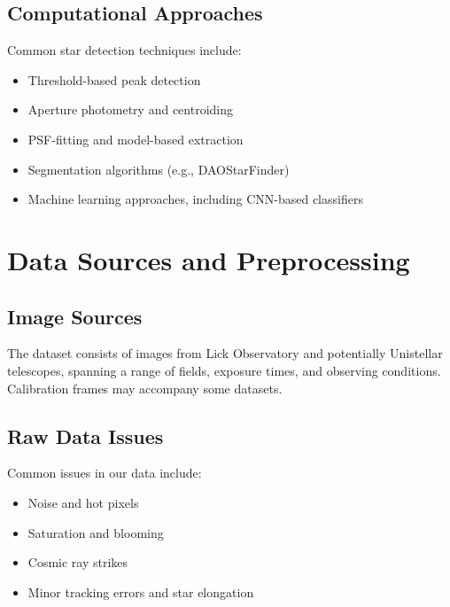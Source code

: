 \documentclass[12pt]{article}
\begin{document}
\subsection{Computational Approaches}
Common star detection techniques include:
\begin{itemize}
    \item Threshold-based peak detection
    \item Aperture photometry and centroiding
    \item PSF-fitting and model-based extraction
    \item Segmentation algorithms (e.g., DAOStarFinder)
    \item Machine learning approaches, including CNN-based classifiers
\end{itemize}

\section{Data Sources and Preprocessing}

\subsection{Image Sources}
The dataset consists of images from Lick Observatory and potentially Unistellar telescopes, spanning a range of fields, exposure times, and observing conditions. Calibration frames may accompany some datasets.

\subsection{Raw Data Issues}
Common issues in our data include:
\begin{itemize}
    \item Noise and hot pixels
    \item Saturation and blooming
    \item Cosmic ray strikes
    \item Minor tracking errors and star elongation
\end{itemize}
\end{document}
